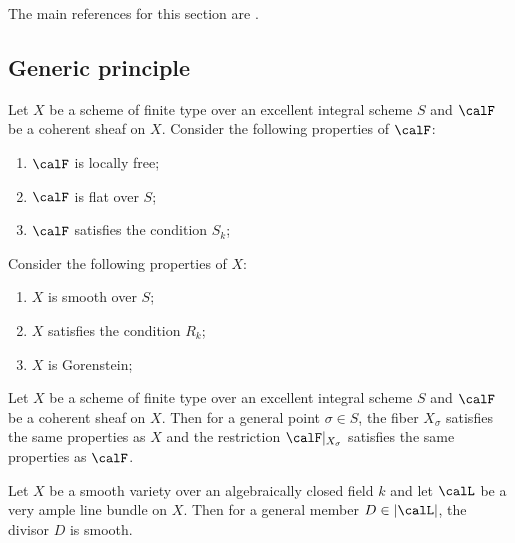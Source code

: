 The main references for this section are \cite{Har77,Laz04a,FOV99:joinsAndIntersections}.



\subsection{Generic principle}

    Let \(X\) be a scheme of finite type over an excellent integral scheme \(S\) and \(\calF\) be a coherent sheaf on \(X\).
    Consider the following properties of \(\calF\):
    \begin{enumerate}
        \item \(\calF\) is locally free;
        \item \(\calF\) is flat over \(S\);
        \item \(\calF\) satisfies the condition \(S_k\);
    \end{enumerate}

    Consider the following properties of \(X\):
    \begin{enumerate}
        \item \(X\) is smooth over \(S\);
        \item \(X\) satisfies the condition \(R_k\);
        \item \(X\) is Gorenstein;
    \end{enumerate}

    \begin{theorem}\label{thm:generic_principle_for_schemes}
        Let \(X\) be a scheme of finite type over an excellent integral scheme \(S\) and \(\calF\) be a coherent sheaf on \(X\).
        Then for a general point \(\sigma \in S\), the fiber \(X_\sigma\) satisfies the same properties as \(X\) and the restriction \(\calF|_{X_\sigma}\) satisfies the same properties as \(\calF\).
        \Yang{}
    \end{theorem}

    \begin{theorem}\label{thm:generic_principle_for_coherent_sheaves}
        
    \end{theorem}

    \begin{corollary}\label{cor:bertini_for_smooth_condition}
        Let \(X\) be a smooth variety over an algebraically closed field \(k\) and let \(\calL\) be a very ample line bundle on \(X\).
        Then for a general member \(D \in |\calL|\), the divisor \(D\) is smooth.
        \Yang{}
    \end{corollary}


